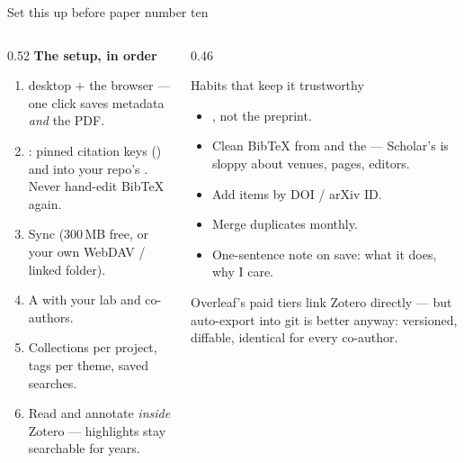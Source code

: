 \documentclass[aspectratio=169,11pt]{beamer}
\begin{document}
\begin{frame}{Set this up before paper number ten}
\begin{columns}[T]
\begin{column}{0.52\textwidth}
\textbf{The setup, in order}
\begin{enumerate}\footnotesize
  \item {} desktop + the browser  --- one click saves
        metadata \emph{and} the PDF.
  \item {}: pinned citation keys
        () and  into your repo's
        . Never hand-edit BibTeX again.
  \item Sync (300\,MB free, or your own WebDAV / linked folder).
  \item A  with your lab and co-authors.
  \item Collections per project, tags per theme, saved searches.
  \item Read and annotate \emph{inside} Zotero --- highlights stay searchable
        for years.
\end{enumerate}
\end{column}
\begin{column}{0.46\textwidth}
\begin{block}{Habits that keep it trustworthy}
\footnotesize
\begin{itemize}
  \item {}, not the preprint.
  \item Clean BibTeX from  and the  --- Scholar's
        is sloppy about venues, pages, editors.
  \item Add items by DOI / arXiv ID.
  \item Merge duplicates monthly.
  \item One-sentence note on save: what it does, why I care.
\end{itemize}
\end{block}
\footnotesize
Overleaf's paid tiers link Zotero directly --- but auto-export into git is
better anyway: versioned, diffable, identical for every co-author.
\end{column}
\end{columns}
\end{frame}
\end{document}
